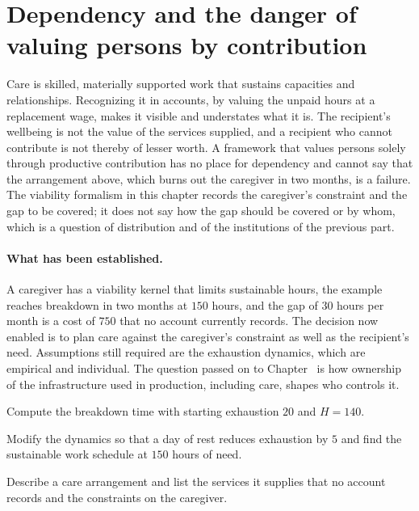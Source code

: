 \section{Dependency and the danger of valuing persons by contribution}

Care is skilled, materially supported work that sustains capacities and relationships. Recognizing it in accounts, by valuing the unpaid hours at a replacement wage, makes it visible and understates what it is. The recipient's wellbeing is not the value of the services supplied, and a recipient who cannot contribute is not thereby of lesser worth. A framework that values persons solely through productive contribution has no place for dependency and cannot say that the arrangement above, which burns out the caregiver in two months, is a failure. The viability formalism in this chapter records the caregiver's constraint and the gap to be covered; it does not say how the gap should be covered or by whom, which is a question of distribution and of the institutions of the previous part.

\paragraph{What has been established.} A caregiver has a viability kernel that limits sustainable hours, the example reaches breakdown in two months at $150$ hours, and the gap of $30$ hours per month is a cost of $750$ that no account currently records. The decision now enabled is to plan care against the caregiver's constraint as well as the recipient's need. Assumptions still required are the exhaustion dynamics, which are empirical and individual. The question passed on to Chapter~ is how ownership of the infrastructure used in production, including care, shapes who controls it.

\begin{exercise}
Compute the breakdown time with starting exhaustion $20$ and $H=140$.
\end{exercise}
\begin{exercise}
Modify the dynamics so that a day of rest reduces exhaustion by $5$ and find the sustainable work schedule at $150$ hours of need.
\end{exercise}
\begin{exercise}
Describe a care arrangement and list the services it supplies that no account records and the constraints on the caregiver.
\end{exercise}

